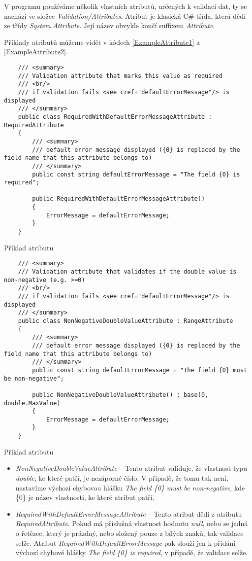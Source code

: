 V programu používáme několik vlastních atributů, určených k validaci dat, ty se nachází ve složce \textit{Validation/Attributes}.
Atribut je klasická C\# třída, která dědí ze třídy \textit{System.Attribute}. Její název obvykle končí suffixem \textit{Attribute}.

Příklady atributů můžeme vidět v kódech \ref{ExampleAttribute1} a \ref{ExampleAttribute2}.

\begin{program}
	\begin{lstlisting}
	/// <summary>
	/// Validation attribute that marks this value as required
	/// <br/>
	/// if validation fails <see cref="defaultErrorMessage"/> is displayed
	/// </summary>
	public class RequiredWithDefaultErrorMessageAttribute : RequiredAttribute
	{
		/// <summary>
		/// default error message displayed ({0} is replaced by the field name that this attribute belongs to)
		/// </summary>
		public const string defaultErrorMessage = "The field {0} is required";
		
		public RequiredWithDefaultErrorMessageAttribute()
		{
			ErrorMessage = defaultErrorMessage;
		}
	}
	\end{lstlisting}
	\caption{Příklad atributu}
	\label{ExampleAttribute1}
\end{program}

\begin{program}
	\begin{lstlisting}
	/// <summary>
	/// Validation attribute that validates if the double value is non-negative (e.g. >=0)
	/// <br/>
	/// if validation fails <see cref="defaultErrorMessage"/> is displayed
	/// </summary>
	public class NonNegativeDoubleValueAttribute : RangeAttribute
	{
		/// <summary>
		/// default error message displayed ({0} is replaced by the field name that this attribute belongs to)
		/// </summary>
		public const string defaultErrorMessage = "The field {0} must be non-negative";
		
		public NonNegativeDoubleValueAttribute() : base(0, double.MaxValue)
		{
			ErrorMessage = defaultErrorMessage;
		}
	}
	\end{lstlisting}
	\caption{Příklad atributu}
	\label{ExampleAttribute2}
\end{program}

\begin{itemize}
\item \textit{NonNegativeDoubleValueAttribute} -- Tento atribut validuje, že vlastnost ty\-pu \textit{double}, ke které patří, je nezáporné číslo. V případě, že tomu tak není, nastavíme výchozí chybovou hlášku \textit{The field \{0\} must be non-negative}, kde \{0\} je název vlastnosti, ke které atribut patří.

\item \textit{RequiredWithDefaultErrorMessageAttribute} -- Tento atribut dědí z atributu \textit{RequiredAttribute}. Pokud má příslušná vlastnost hodnotu \textit{null}, nebo se jedná o řetězec, který je prázdný, nebo složený pouze z bílých znaků, tak validace selže. Atribut \textit{RequiredWithDefaultErrorMessage} pak slouží jen k přidání výchozí chybové hlášky \textit{The field \{0\} is required}, v případě, že validace selže.

\end{itemize}

